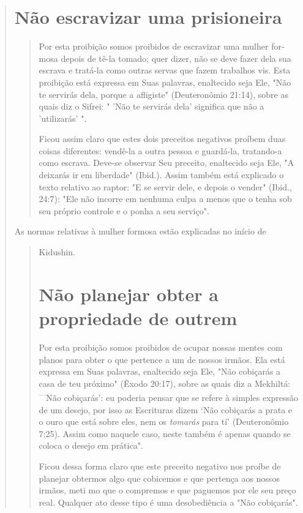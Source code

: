 \begin{quote}
\section{Não escravizar uma prisioneira}

\begin{quote}
Por esta proibição somos proibidos de escravizar uma mulher for­mosa
depois de tê-la tomado; quer dizer, não se deve fazer dela sua escrava e
tratá-la como outras servas que fazem trabalhos vis. Esta proibição está
ex­pressa em Suas palavras, enaltecido seja Ele, "Não te servirás dela,
porque a afligiste" (Deuteronômio 21:14), sobre as quais diz o Sifrei: "
'Não te servirás dela' significa que não a 'utilizarás' ".

Ficou assim claro que estes dois preceitos negativos proíbem duas coisas
diferentes: vendê-la a outra pessoa e guardá-la, tratando-a como
escrava. Deve-se observar Seu preceito, enaltecido seja Ele, "A deixarás
ir em liberda­de" (Ibid.). Assim também está explicado o texto relativo
ao raptor: "E se ser­vir dele, e depois o vender" (Ibid., 24:7): "Ele
não incorre em nenhuma culpa a menos que o tenha sob seu próprio
controle e o ponha a seu serviço".
\end{quote}

As normas relativas à mulher formosa estão explicadas no início de

\begin{quote}
Kidushin.

\section{Não planejar obter a propriedade de outrem}

Por esta proibição somos proibidos de ocupar nossas mentes com planos
para obter o que pertence a um de nossos irmãos. Ela está expressa em
Suas palavras, enaltecido seja Ele, "Não cobiçarás a casa de teu
próximo" (Êxo­do 20:17), sobre as quais diz a Mekhiltá:
\textsuperscript{---}Não cobiçarás': eu poderia pensar que se refere à
simples expressão de um desejo, por isso as Escrituras dizem `Não
cobiçarás a prata e o ouro que está sobre eles, nem os \emph{tomarás}
para tí' (Deuteronômio 7:25). Assim como naquele caso, neste também é
apenas quan­do se coloca o desejo em prática".

Ficou dessa forma claro que este preceito negativo nos proíbe de
planejar obtermos algo que cobicemos e que pertença aos nossos irmãos,
meti mo que o compremos e que paguemos por ele seu preço real. Qualquer
ato desse tipo é uma desobediência a "Não cobiçarás".


\end{quote}
\end{quote}

